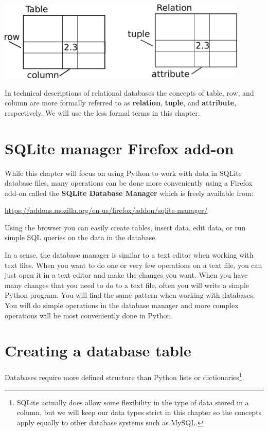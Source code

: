 \documentclass[11pt]{book}
\begin{document}
\beforefig
\centerline{\includegraphics[height=1.50in]{figs2/relational.eps}}
\afterfig

In technical descriptions of relational databases the concepts of 
table, row, and column are more formally referred
to as {\bf relation}, {\bf tuple}, and {\bf attribute}, respectively.
We will use the less formal terms in this chapter.

\section{SQLite manager Firefox add-on}

While this chapter will focus on using Python to work with data 
in SQLite database files, many operations can be done more
conveniently using a Firefox add-on called the {\bf SQLite
Database Manager} which is freely available from:

\url{https://addons.mozilla.org/en-us/firefox/addon/sqlite-manager/}

Using the browser you can easily create tables, insert data, edit data, 
or run simple SQL queries on the data in the database.

In a sense, the database manager is similar to a text editor
when working with text files.   When you want to do one or
very few operations on a text file, you can just open it
in a text editor and make the changes you want.   When you have 
many changes that you need to do to a text file, often you 
will write a simple Python program.  You will find the same 
pattern when working with databases.  You will do simple
operations in the database manager and more complex operations
will be most conveniently done in Python.

\section{Creating a database table}

Databases require more defined structure than Python lists 
or dictionaries\footnote{SQLite actually does allow some 
flexibility in the type of data stored in a column,
but we will keep our data types strict in this chapter
so the concepts apply equally to other database systems 
such as MySQL.}.  
\end{document}
